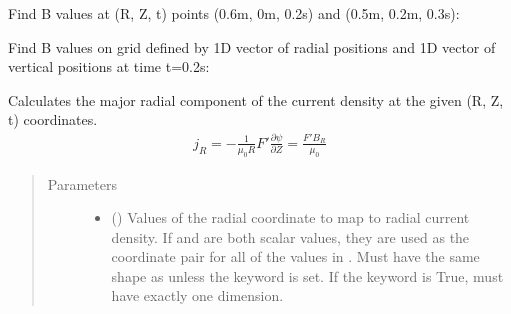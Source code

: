 \documentclass[letterpaper,10pt,english]{sphinxmanual}
\begin{document}
\begin{fulllineitems}
\begin{fulllineitems}
Find B values at (R, Z, t) points (0.6m, 0m, 0.2s) and (0.5m, 0.2m, 0.3s):

\begin{sphinxVerbatim}[commandchars=\\\{\}]
  \PYG{p}{[} \PYG{p}{]} \PYG{p}{[} \PYG{p}{]} \PYG{p}{[} \PYG{p}{]} 
\end{sphinxVerbatim}

Find B values on grid defined by 1D vector of radial positions 
and 1D vector of vertical positions  at time t=0.2s:

\begin{sphinxVerbatim}[commandchars=\\\{\}]
     
\end{sphinxVerbatim}

\end{fulllineitems}


\begin{fulllineitems}
\label{\detokenize{eqtools:eqtools.core.Equilibrium.rz2jR}}
Calculates the major radial component of the current density at the given (R, Z, t) coordinates.
\begin{equation*}
\begin{split}j_R = -\frac{1}{\mu_0 R}F'\frac{\partial \psi}{\partial Z} = \frac{F' B_R}{\mu_0}\end{split}
\end{equation*}\begin{quote}\begin{description}
\item[{Parameters}] \leavevmode\begin{itemize}
\item {} 
 () \textendash{} Values of the radial coordinate to
map to radial current density. If  and  are both scalar
values, they are used as the coordinate pair for all of the
values in . Must have the same shape as  unless the
 keyword is set. If the  keyword is True,
 must have exactly one dimension.


\end{itemize}
\end{description}
\end{quote}
\end{fulllineitems}
\end{fulllineitems}
\end{document}
